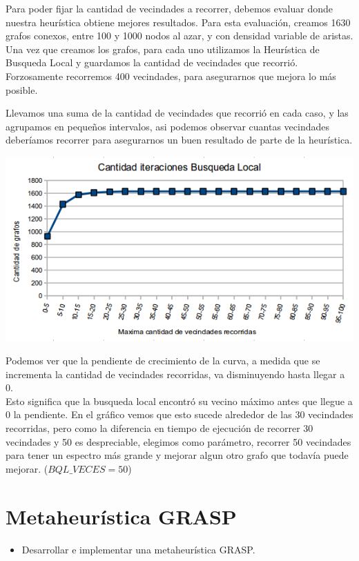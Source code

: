 \documentclass[a4paper, 10pt]{article}
\begin{document}
Para poder fijar la cantidad de vecindades a recorrer, debemos evaluar donde nuestra heur\'istica obtiene mejores resultados.
Para esta evaluaci\'on, creamos 1630 grafos conexos, entre 100 y 1000 nodos al azar, y con densidad variable de aristas.
Una vez que creamos los grafos, para cada uno utilizamos la Heur\'istica de Busqueda Local y guardamos la cantidad de vecindades que recorri\'o.
Forzosamente recorremos 400 vecindades, para asegurarnos que mejora lo m\'as posible.

Llevamos una suma de la cantidad de vecindades que recorri\'o en cada caso, y las agrupamos en peque\~nos intervalos, asi podemos observar cuantas vecindades deber\'iamos recorrer para asegurarnos un buen resultado de parte de la heur\'istica.

\begin{center}
	\includegraphics[scale=0.65]{Graficos/05-01.png}
\end{center}

Podemos ver que la pendiente de crecimiento de la curva, a medida que se incrementa la cantidad de vecindades recorridas, va disminuyendo hasta llegar a 0. \\
Esto significa que la busqueda local encontr\'o su vecino m\'aximo antes que llegue a 0 la pendiente.
En el gr\'afico vemos que esto sucede alrededor de las 30 vecindades recorridas, pero como la diferencia en tiempo de ejecuci\'on de recorrer 30 vecindades y 50 es despreciable, elegimos como par\'ametro, recorrer 50 vecindades para tener un espectro m\'as grande y mejorar algun otro grafo que todav\'ia puede mejorar. ($BQL\_VECES = 50$)

\newpage

\section{Metaheur\'istica GRASP}
\begin{itemize}
	\item Desarrollar e implementar una metaheur\'istica GRASP.
\end{itemize}
\end{document}

